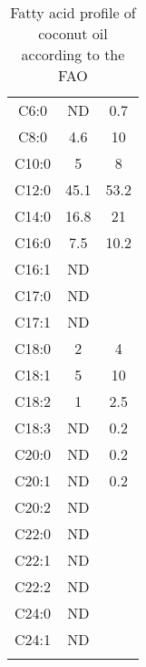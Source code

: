 \begin{table}
	\caption{Fatty acid profile of coconut oil according to the FAO \autocite{JFAOWHOCAC2019}}
	\label{tab:CoconutFAO}
	\centering
\begin{tabular}{c|c|c}
\toprule
	\tabhead{Fatty acid} & \tabhead{Lower} &   	\tabhead{Upper}	\\
	\midrule
C6:0	&ND&	0.7	\\
C8:0	&4.6	&10\\
C10:0	&5	&8	\\
C12:0	&45.1	&53.2	\\
C14:0	&16.8	&21	\\
C16:0	&7.5	&10.2	\\
C16:1	&ND	&	\\
C17:0	&ND	&	\\
C17:1	&ND	&	\\
C18:0	&2	&4	\\
C18:1	&5	&10	\\
C18:2	&1	&2.5	\\
C18:3	&ND	&0.2	\\
C20:0	&ND	&0.2	\\
C20:1	&ND	&0.2	\\
C20:2	&ND	&	\\
C22:0	&ND	&	\\
C22:1	&ND	&	\\
C22:2	&ND	&	\\
C24:0	&ND	&	\\
C24:1	&ND	&	\\
	\bottomrule\\
\end{tabular}
\end{table}

